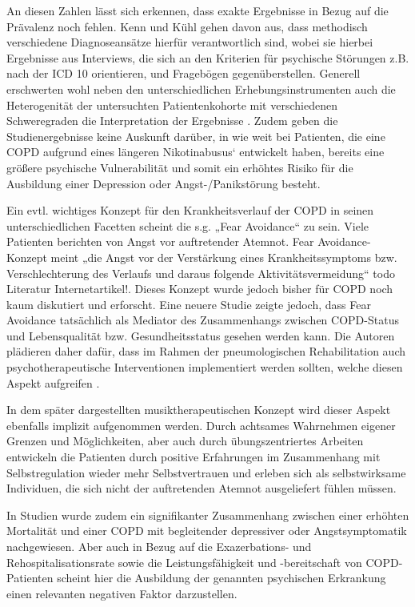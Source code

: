 An diesen Zahlen lässt sich erkennen, dass exakte Ergebnisse in Bezug auf die Prävalenz noch fehlen. Kenn und Kühl gehen davon aus, dass methodisch verschiedene Diagnoseansätze hierfür verantwortlich sind, wobei sie hierbei Ergebnisse aus Interviews, die sich an den Kriterien für psychische Störungen z.B. nach der ICD 10 orientieren, und Fragebögen gegenüberstellen. Generell erschwerten wohl neben den unterschiedlichen Erhebungsinstrumenten auch die Heterogenität der untersuchten Patientenkohorte mit verschiedenen Schweregraden die Interpretation der Ergebnisse \autocite[vgl.][35]{kenn2011}.
Zudem geben die Studienergebnisse keine Auskunft darüber, in wie weit bei Patienten, die eine COPD aufgrund eines längeren Nikotinabusus‘ entwickelt haben, bereits eine größere psychische Vulnerabilität und somit ein erhöhtes Risiko für die Ausbildung einer Depression oder Angst-/Panikstörung besteht. 

Ein evtl. wichtiges Konzept für den Krankheitsverlauf der COPD in seinen unterschiedlichen Facetten scheint die s.g. „Fear Avoidance“ zu sein. Viele Patienten berichten von Angst vor auftretender Atemnot. Fear Avoidance- Konzept meint „die Angst vor der Verstärkung eines Krankheitssymptoms bzw. Verschlechterung des Verlaufs und daraus folgende Aktivitätsvermeidung“ \autocite{stenzel20013} todo Literatur Internetartikel!. Dieses Konzept wurde jedoch bisher für COPD noch kaum diskutiert und erforscht. Eine neuere Studie zeigte jedoch, dass Fear Avoidance tatsächlich als Mediator des Zusammenhangs zwischen COPD-Status und Lebensqualität bzw. Gesundheitsstatus gesehen werden kann. Die Autoren plädieren daher dafür, dass im Rahmen der pneumologischen Rehabilitation auch psychotherapeutische Interventionen implementiert werden sollten, welche diesen Aspekt aufgreifen \autocite{stenzel20013}. 

In dem später dargestellten musiktherapeutischen Konzept wird dieser Aspekt ebenfalls implizit aufgenommen werden. Durch achtsames Wahrnehmen eigener Grenzen und Möglichkeiten, aber auch durch übungszentriertes Arbeiten entwickeln die Patienten durch positive Erfahrungen im Zusammenhang mit Selbstregulation wieder mehr Selbstvertrauen und erleben sich als selbstwirksame Individuen, die sich nicht der auftretenden Atemnot ausgeliefert fühlen müssen.

In Studien wurde zudem ein signifikanter Zusammenhang zwischen einer erhöhten Mortalität und einer COPD mit begleitender depressiver oder Angstsymptomatik nachgewiesen. Aber auch in Bezug auf die Exazerbations- und Rehospitalisationsrate sowie die Leistungsfähigkeit und -bereitschaft von COPD-Patienten scheint hier die Ausbildung der genannten psychischen Erkrankung einen relevanten negativen Faktor darzustellen\autocite[vgl.]{kenn2011}.

